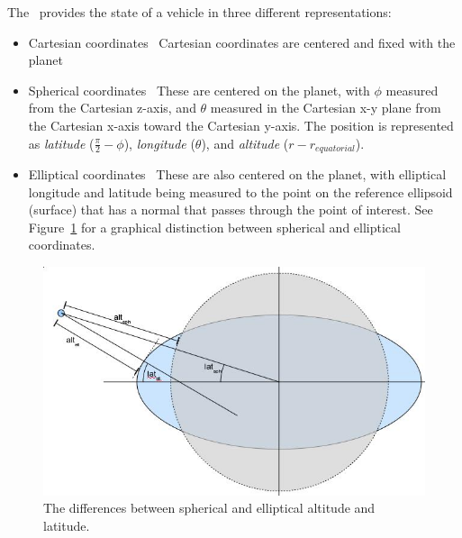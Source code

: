 %
%
% 
%


\label{ch:planetaryintro}
The \PlanetaryDesc\ provides the state of a vehicle in three different representations:
\begin{itemize}
\item{Cartesian coordinates}\ \newline
 Cartesian coordinates are centered and fixed with the planet
\item{Spherical coordinates}\ \newline
These are centered on the planet, with $\phi$ measured from the Cartesian z-axis, and $\theta$ measured in the Cartesian x-y plane from the Cartesian x-axis toward the Cartesian y-axis.  The position is represented as \textit{latitude} ($\frac{\pi}{2} - \phi$), \textit{longitude} ($\theta$), and \textit{altitude} ($r - r_{equatorial}$).
\item{Elliptical coordinates}\ \newline
These are also centered on the planet, with elliptical longitude and latitude being measured to the point on the reference ellipsoid (surface) that has a normal that passes through the point of interest.  See Figure~\ref{fig:planetaryellipticalspherical} for a graphical distinction between spherical and elliptical coordinates.
\end{itemize}

\begin{figure}[htp]
\begin{center}
\includegraphics[width=5in]{figures/sphericalelliptical.jpg}
\caption{The differences between spherical and elliptical altitude and latitude.}
\label{fig:planetaryellipticalspherical}
\end{center}
\end{figure}












